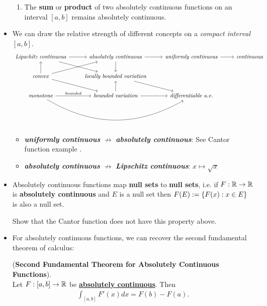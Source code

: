 \documentclass[11pt]{article}
\begin{document}
\begin{itemize}
\begin{proposition}
\begin{enumerate}
\item The \textbf{sum} or \textbf{product} of two absolutely continuous functions on an interval $[a, b]$ remains absolutely continuous.
\end{enumerate}
\end{proposition}

\item \begin{remark}
We can draw the relative strength of different concepts on a \emph{compact interval} $[a, b]$.
\[
  \begin{tikzcd}
     \text{\emph{Lipschitz continuous}} \arrow{r}{}  \arrow{dr}{} & \text{\emph{absolutely continuous}} \arrow{d}{} \arrow{r}{} &  \text{\emph{uniformly continuous}}  \arrow{r}{}  &\text{\emph{continuous}} \\
     \text{\emph{convex}} \arrow{u}{} \arrow{ur}{}  \arrow{dr}{} & \text{\emph{locally bounded variation}} \arrow{dr}{} & & \\
\text{\emph{monotone}}  \arrow[rr, bend right]   \arrow{r}{\text{\emph{bounded}}}   & \text{\emph{bounded variation}}  \arrow{u}{} \arrow{r}{} & \text{\emph{differentiable a.e.}} &
  \end{tikzcd}
\] 
\begin{itemize}
\item \emph{\textbf{uniformly continuous}} $\not\rightarrow$ \emph{\textbf{absolutely continuous}}: See Cantor function example \citep{tao2011introduction}.
\item  \emph{\textbf{absolutely continuous}} $\not\rightarrow$ \emph{\textbf{Lipschitz continuous}}: $x \mapsto \sqrt{x}$
\end{itemize}
\end{remark}

\item \begin{proposition}
Absolutely continuous functions map \textbf{null sets} to \textbf{null sets}, i.e. if $F : {\mathbb R} \rightarrow {\mathbb R}$ is \textbf{absolutely continuous} and $E$ is a null set then $F(E) := \left\{F(x): x \in E\right\}$ is also a null set.
\end{proposition} 

\begin{exercise}
Show that the Cantor function does not have this property above.
\end{exercise}

\item For absolutely continuous functions, we can recover the second fundamental theorem of calculus:
\begin{theorem} (\textbf{Second Fundamental Theorem for Absolutely Continuous Functions}).\\
Let $F: [a, b] \rightarrow {\mathbb R}$ be \underline{\textbf{absolutely continuous}}. Then
\begin{align*}
\int_{[a, b]}F'(x) dx = F(b) - F(a).
\end{align*}
\end{theorem}


\end{itemize}
\end{document}
